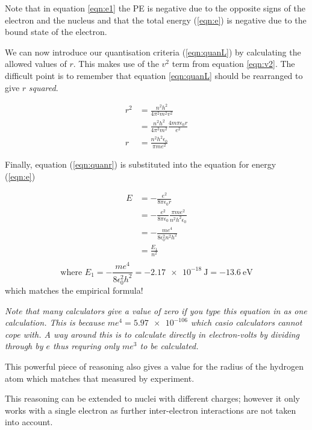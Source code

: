 \documentclass[main.tex]{subfiles}
\begin{document}
Note that in equation \ref{eqn:e1} the PE is negative due to the opposite signs of the electron and the nucleus and that the total energy (\ref{eqn:e}) is negative due to the bound state of the electron.

We can now introduce our quantisation criteria (\ref{eqn:quanL}) by calculating the allowed values of $r$. This makes use of the $v^2$ term from equation \ref{eqn:v2}. The difficult point is to remember that equation \ref{eqn:quanL} should be rearranged to give $r$ \emph{squared}.

\begin{align}
  r^2 &= \frac{n^2 h^2}{4\pi^2 m^2 v^2}\\
  &= \frac{n^2 h^2}{4\pi^2 m^2} \frac{4m\pi\epsilon_0 r}{e^2}\\
  r &= \frac{n^2h^2\epsilon_0}{\pi m e^2} \label{eqn:quanr}
\end{align}

Finally, equation (\ref{eqn:quanr}) is substituted into the equation for energy (\ref{eqn:e})

\begin{align*}
  E &= -\frac{e^2}{8\pi\epsilon_0 r}\\
  &=  -\frac{e^2}{8\pi\epsilon_0} \frac{\pi m e^2}{n^2h^2\epsilon_0} \\
  &= - \frac{me^4}{8\epsilon_0^2 n^2 h^2}\\
  &= \frac{E_1}{n^2}\\
\end{align*}
\[   \text{where } E_1 = -\frac{me^4}{8\epsilon_0^2 h^2} = \SI{-2.17e-18}{\joule} = \SI{-13.6}{\electronvolt} \]
which matches the empirical formula!

\emph{Note that many calculators give a value of zero if you type this equation in as one calculation. This is because $me^4 = \num{5.97e-106}$ which casio calculators cannot cope with. A way around this is to calculate directly in electron-volts by dividing through by $e$ thus requring only $me^3$ to be calculated.}

This powerful piece of reasoning also gives a value for the radius of the hydrogen atom which matches that measured by experiment.

This reasoning can be extended to nuclei with different charges; however it only works with a single electron as further inter-electron interactions are not taken into account.
\end{document}
